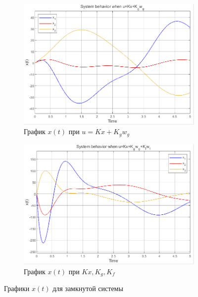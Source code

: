 \documentclass[a4paper, 12pt]{article}
\begin{document}
    \begin{figure}[H]
        \centering
        \begin{subfigure}{0.45\textwidth}
            \centering
            \includegraphics[width=\linewidth]{1task_x_kxkg.png}
            \caption{График $x(t)$ при $u=Kx+K_gw_g$}
            \label{fig:1task_x_kxkg}
        \end{subfigure}
        \hspace{5mm}
        \begin{subfigure}{0.45\textwidth}
            \centering
            \includegraphics[width=\linewidth]{1task_x_kxkgkf.png}
            \caption{График $x(t)$ при $Kx,K_g,K_f$}
            \label{fig:1task_x_kxkgkf}
        \end{subfigure}
        \caption{Графики $x(t)$ для замкнутой системы}
        \label{fig:1task_x_kxkg_kxkgkf}
    \end{figure}
\end{document}
